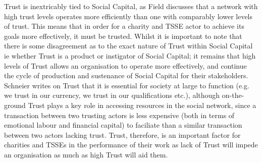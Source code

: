 Trust is inextricably tied to Social Capital, as Field discusses that a network with high trust levels operates more efficiently than one with comparably lower levels of trust. This means that in order for a charity and TSSE actor to achieve its goals more effectively, it must be trusted. Whilst it is important to note that there is some disagreement as to the exact nature of Trust within Social Capital ie whether Trust is a product or instigator of Social Capital; it remains that high levels of Trust allows an organisation to operate more effectively, and continue the cycle of production and sustenance of Social Capital for their stakeholders. Schneier writes on Trust that it is essential for society at large to function (e.g. we trust in our currency, we trust in our qualifications etc.), although on-the-ground Trust plays a key role in accessing resources in the social network, since a transaction between two trusting actors is less expensive (both in terms of emotional labour and financial capital) to faciliate than a similar transaction between two actors lacking trust. Trust, therefore, is an important factor for charities and TSSEs in the performance of their work as lack of Trust will impede an organisation as much as high Trust will aid them.


